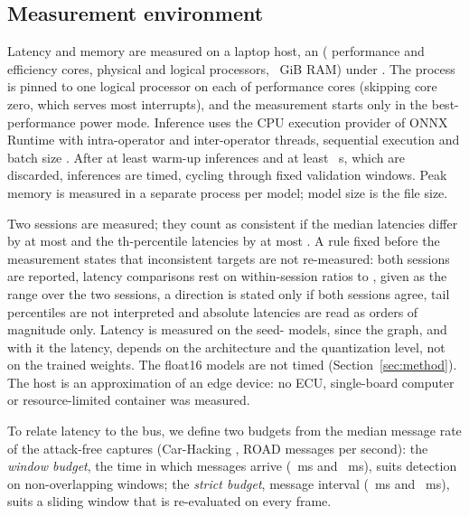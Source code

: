 \subsection{Measurement environment}
Latency and memory are measured on a laptop host, an \CPUName{} (\PerfCores{} performance and \EffCores{}
efficiency cores, \PhysCores{} physical and \LogicalCores{} logical processors, \MemGiB~GiB RAM) under
\OSName. The process is pinned to one logical processor on each of \PinnedCores{} performance cores (skipping core
zero, which serves most interrupts), and the measurement starts only in the best-performance power mode. Inference
uses the CPU execution provider of ONNX Runtime \BenchORTVersion{} with \BenchIntraOp{} intra-operator and
\BenchInterOp{} inter-operator threads, sequential execution and batch size \BenchBatch. After at least
\BenchWarmup{} warm-up inferences and at least \BenchWarmupS~s, which are discarded, \BenchRepeats{} inferences are
timed, cycling through \BenchInputs{} fixed validation windows. Peak memory is measured in a separate process per
model; model size is the file size.

Two sessions are measured; they count as consistent if the median latencies differ by at most \MedianTol{} and the
\TailPct{}th-percentile latencies by at most \PNinetyFiveTol. A rule fixed before the measurement states that inconsistent
targets are not re-measured: both sessions are reported, latency comparisons rest on within-session ratios to
\Qfp{}, given as the range over the two sessions, a direction is stated only if both sessions agree, tail
percentiles are not interpreted and absolute latencies are read as orders of magnitude only. Latency is measured on
the seed-\BenchSeed{} models, since the graph, and with it the latency, depends on the architecture and the
quantization level, not on the trained weights. The float16 models are not timed (Section~\ref{sec:method}). The
host is an approximation of an edge device: no ECU, single-board computer or resource-limited container was
measured.

To relate latency to the bus, we define two budgets from the median message rate of the attack-free captures
(Car-Hacking \MsgRateCH, ROAD \MsgRateROAD{} messages per second): the \emph{window budget}, the time in which
\BudgetWindowMsgs{} messages arrive (\BudgetWindowCH~ms and \BudgetWindowROAD~ms), suits detection on
non-overlapping windows; the \emph{strict budget}, \BudgetStrictMsgs{} message interval (\BudgetStrictCH~ms and
\BudgetStrictROAD~ms), suits a sliding window that is re-evaluated on every frame.
